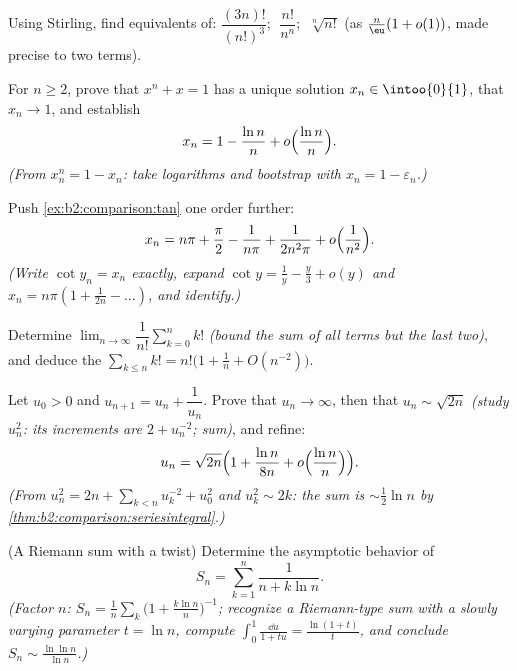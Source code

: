 \begin{exercise}[$\star\star$]\label{exo:b2:comparison:4}
Using Stirling, find equivalents of: $\dfrac{(3n)!}{(n!)^3}$;
$\;\dfrac{n!}{n^n}$; $\;\sqrt[n]{n!}$ (as $\frac n\eu(1 + o(1))$,
made precise to two terms).
\end{exercise}

\begin{exercise}[$\star\star$]\label{exo:b2:comparison:5}
For $n \geq 2$, prove that $x^n + x = 1$ has a unique solution $x_n
\in \intoo{0}{1}$, that $x_n \to 1$, and establish
\[
x_n = 1 - \frac{\ln n}{n} + o\Bigl(\frac{\ln n}{n}\Bigr).
\]
\emph{(From $x_n^n = 1 - x_n$: take logarithms and bootstrap with
$x_n = 1 - \varepsilon_n$.)}
\end{exercise}

\begin{exercise}[$\star\star$]\label{exo:b2:comparison:6}
Push \cref{ex:b2:comparison:tan} one order further:
\[
x_n = n\pi + \frac\pi2 - \frac{1}{n\pi} + \frac{1}{2n^2\pi} +
o\Bigl(\frac{1}{n^2}\Bigr).
\]
\emph{(Write $\cot y_n = x_n$ exactly, expand $\cot y = \frac1y -
\frac y3 + o(y)$ and $x_n = n\pi(1 + \frac{1}{2n} - \dots)$, and
identify.)}
\end{exercise}

\begin{exercise}[$\star\star$]\label{exo:b2:comparison:7}
Determine $\lim_{n\to\infty} \dfrac{1}{n!}\sum_{k=0}^{n} k!$
\emph{(bound the sum of all terms but the last two)}, and deduce the
 $\sum_{k \leq n} k! = n!\bigl(1 + \frac1n +
O(n^{-2})\bigr)$.
\end{exercise}

\begin{exercise}[$\star\star\star$]\label{exo:b2:comparison:8}
Let $u_0 > 0$ and $u_{n+1} = u_n + \dfrac{1}{u_n}$. Prove that $u_n
\to \infty$, then that $u_n \sim \sqrt{2n}$ \emph{(study $u_n^2$:
its increments are $2 + u_n^{-2}$; sum)}, and refine:
\[
u_n = \sqrt{2n}\Bigl(1 + \frac{\ln n}{8n} +
o\Bigl(\frac{\ln n}{n}\Bigr)\Bigr).
\]
\emph{(From $u_n^2 = 2n + \sum_{k<n} u_k^{-2} + u_0^2$ and $u_k^2
\sim 2k$: the sum is $\sim \frac12\ln n$ by
\cref{thm:b2:comparison:seriesintegral}.)}
\end{exercise}

\begin{exercise}[$\star\star\star$]\label{exo:b2:comparison:9}
(A Riemann sum with a twist) Determine the asymptotic behavior of
\[
S_n = \sum_{k=1}^{n} \frac{1}{n + k\ln n} .
\]
\emph{(Factor $n$: $S_n = \frac1n\sum_k \bigl(1 +
\frac{k\ln n}{n}\bigr)^{-1}$; recognize a Riemann-type sum with a
slowly varying parameter $t = \ln n$, compute $\int_0^1
\frac{\dd u}{1 + tu} = \frac{\ln(1+t)}{t}$, and conclude $S_n \sim
\frac{\ln\ln n}{\ln n}$.)}
\end{exercise}

